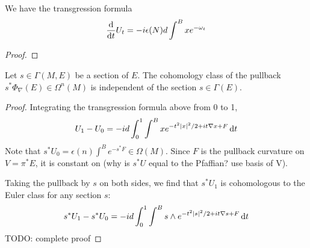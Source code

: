 \begin{prop} %
	We have the transgression formula
	\[
	\odv{}{t} U_t = -i\epsilon(N) d\int^B x e^{-\omega_t}
	\] 
\end{prop}
\begin{proof}
	
\end{proof}
\begin{prop} \label{prop:thom_pullback}
	Let $s\in \Gamma(M,E)$ be a section of $E$.
	The cohomology class of the pullback $s^*\Phi_\nabla(E) \in \Omega^{n}(M)$
	is independent of the section  $s\in\Gamma(E)$.
\end{prop}
\begin{proof}
	Integrating the transgression formula above from 0 to 1, 
	\[
		U_1 - U_0 = -id\int_0^1\int^B x e^{-t^2\abs{x}^2/2 +
		it\nabla x + F} \odif{t}
	\] 
	Note that $s^*U_0 = \epsilon(n)\int^B e^{-s^*F} \in \Omega(M)$. Since $F$ is
	the pullback curvature on $V = \pi^*E$, it is constant on 
	(why is $s^*U$ equal to the Pfaffian? use basis of V).

	Taking the pullback by $s$ on both sides, we find that $s^*U_1$ is
	cohomologous to the Euler class for any section $s$:  
	\[
		s^*U_1 - s^*U_0 = -id\int_0^1\int^B s\wedge e^{-t^2\abs{s}^2/2 +
		it\nabla s + F} \odif{t}
	\] 
	TODO: complete proof
\end{proof}



